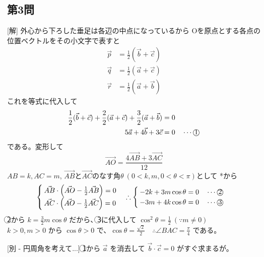 \documentclass[../main.tex]{subfiles}
\begin{document}
\subsection*{第3問}
[解] 外心から下ろした垂足は各辺の中点になっているから
Oを原点とする各点の位置ベクトルをその小文字で表すと
\begin{align*}
  \vec{p} &= \frac{1}{2}(\vec{b} + \vec{c}) \\
  \vec{q} &= \frac{1}{2}(\vec{a} + \vec{c}) \\
  \vec{r} &= \frac{1}{2}(\vec{a} + \vec{b})
\end{align*}
これを等式に代入して
\begin{align*}
  \frac{1}{2}(\vec{b} + \vec{c}) + \frac{2}{2}(\vec{a} + \vec{c}) + \frac{3}{2}(\vec{a} + \vec{b}) &= 0 \\
  5\vec{a} + 4\vec{b} + 3\vec{c} &= 0 \quad \cdots \text{\textcircled{1}}
\end{align*}
である。変形して
\begin{equation*}
  \vec{AO} = \frac{4\vec{AB} + 3\vec{AC}}{12}
\end{equation*}
$AB=k, AC=m$, $\vec{AB}$と$\vec{AC}$のなす角$\theta\ (0 < k, m, 0 < \theta < \pi)$として
*から
\begin{equation*}
  \begin{cases}
    \vec{AB} \cdot \left(\vec{AO} - \frac{1}{2}\vec{AB}\right) = 0 \\
    \vec{AC} \cdot \left(\vec{AO} - \frac{1}{2}\vec{AC}\right) = 0
  \end{cases}
  \therefore
  \begin{cases}
    -2k + 3m \cos\theta = 0 \quad \cdots \text{\textcircled{2}} \\
    -3m + 4k \cos\theta = 0 \quad \cdots \text{\textcircled{3}}
  \end{cases}
\end{equation*}
\textcircled{2}から $k = \frac{3}{2}m \cos\theta$ だから、\textcircled{3}に代入して $\cos^2\theta = \frac{1}{2} \ (\because m \neq 0)$ \\
$k > 0, m > 0$ から $\cos\theta > 0$ で、$\cos\theta = \frac{\sqrt{2}}{2} \quad \therefore \angle BAC = \frac{\pi}{4}$ である。

[別 - 円周角を考えて...]
\textcircled{1}から $\vec{a}$ を消去して $\vec{b} \cdot \vec{c} = 0$ がすぐ求まるが。

\begin{center}
\end{center}
\end{document}
